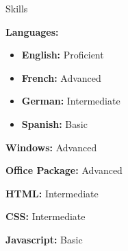 \begin{rubric}{Skills}

  \entry* 
  \textbf{Languages:} 
  \begin{itemize}
  \item \textbf{English:} Proficient
  \item \textbf{French:} Advanced

  \item \textbf{German:} Intermediate

  \item \textbf{Spanish:} Basic

  \end{itemize}

  \entry* \textbf{Windows:} Advanced

  \entry* \textbf{Office Package:} Advanced

  \entry* \textbf{HTML:} Intermediate

  \entry* \textbf{CSS:} Intermediate

  \entry* \textbf{Javascript:} Basic

\end{rubric}
